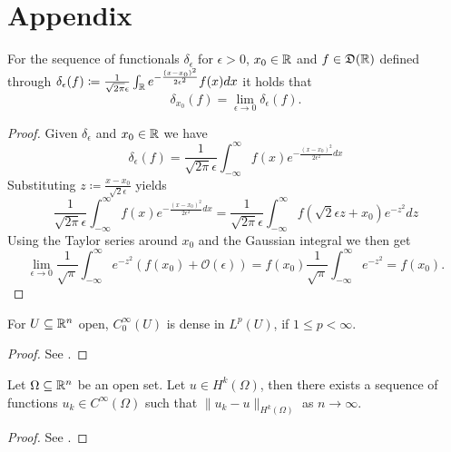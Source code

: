 \chapter*{Appendix}  

\begin{atheorem} \label{athem:delta}
	For the sequence of functionals $\delta_{\epsilon}$ for $\epsilon > 0$, $x_{0} \in \mathbb{R}$ and $f \in \mathfrak{D}(\mathbb{R})$ defined through $\delta_{\epsilon}(f) \coloneqq \frac{1}{\sqrt{2 \pi} \epsilon} \int_{\mathbb{R}} e^{-\frac{(x - x_{0})^{2}}{2 \epsilon^{2}}} f(x) dx$ it holds that  
 		\[ \delta_{x_{0}}(f) = \lim_{\epsilon \rightarrow 0} \delta_{\epsilon}(f). \]
	
	\begin{proof}
		Given $\delta_{\epsilon}$ and $x_{0} \in \mathbb{R}$ we have
			\[ \delta_{\epsilon}(f) = \frac{1}{\sqrt{2 \pi} \epsilon} \int_{-\infty}^{\infty} f(x) e^{-\frac{(x-x_{0})^{2}}{2 \epsilon^{2}} dx} \]
		Substituting $z \coloneqq \frac{x - x_{0}}{\sqrt{2} \epsilon}$ yields
			\[ \frac{1}{\sqrt{2 \pi} \epsilon} \int_{-\infty}^{\infty} f(x) e^{-\frac{(x-x_{0})^{2}}{2 \epsilon^{2}} dx} = \frac{1}{\sqrt{2 \pi} \epsilon} \int_{-\infty}^{\infty} f(\sqrt{2} \epsilon z + x_{0}) e^{-z^{2}} dz \]
		Using the Taylor series around $x_{0}$ and the Gaussian integral we then get
			\[ \lim_{\epsilon \rightarrow 0} \frac{1}{\sqrt{\pi}} \int_{-\infty}^{\infty} e^{-z^{2}} \left( f(x_{0}) + \mathcal{O}(\epsilon) \right) = f(x_{0}) \frac{1}{\sqrt{\pi}} \int_{-\infty}^{\infty} e^{-z^{2}} = f(x_{0}). \]
	\end{proof}
\end{atheorem}

\begin{atheorem}
	For $U \subseteq \mathbb{R}^{n}$ open, $C_{0}^{\infty}(U)$ is dense in $L^{p}(U)$, if $1 \leq p < \infty$.
	
	\begin{proof}
		See \cite[p. 31]{adams2003sobolev}.
	\end{proof}
\end{atheorem}

\begin{atheorem} 
	Let $\Omega \subseteq \mathbb{R}^{n}$ be an open set. Let $u \in H^{k}(\Omega)$, then there exists a sequence of functions $u_{k} \in C^{\infty}(\Omega)$ such that $\| u_{k} - u \|_{H^{k}(\Omega)}$ as $n \rightarrow \infty$.
	
	\begin{proof}
		See \cite[p. 138]{adams2003sobolev}.
	\end{proof}	
\end{atheorem}


